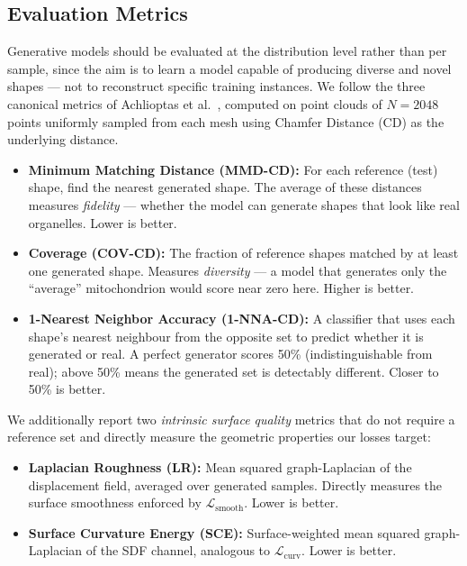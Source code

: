 \documentclass[10pt, a4paper, twocolumn]{article}
\begin{document}
\subsection{Evaluation Metrics}

Generative models should be evaluated at the distribution level rather than per sample, since the aim is to learn a model capable of producing diverse and novel shapes — not to reconstruct specific training instances. We follow the three canonical metrics of Achlioptas et al.~\cite{achlioptas2018learning}, computed on point clouds of $N=2048$ points uniformly sampled from each mesh using Chamfer Distance (CD) as the underlying distance.

\begin{itemize}
    \item \textbf{Minimum Matching Distance (MMD-CD):} For each reference (test) shape, find the nearest generated shape. The average of these distances measures \emph{fidelity} — whether the model can generate shapes that look like real organelles. Lower is better.

    \item \textbf{Coverage (COV-CD):} The fraction of reference shapes matched by at least one generated shape. Measures \emph{diversity} — a model that generates only the ``average'' mitochondrion would score near zero here. Higher is better.

    \item \textbf{1-Nearest Neighbor Accuracy (1-NNA-CD):} A classifier that uses each shape's nearest neighbour from the opposite set to predict whether it is generated or real. A perfect generator scores 50\% (indistinguishable from real); above 50\% means the generated set is detectably different. Closer to 50\% is better.
\end{itemize}

We additionally report two \emph{intrinsic surface quality} metrics that do not require a reference set and directly measure the geometric properties our losses target:

\begin{itemize}
    \item \textbf{Laplacian Roughness (LR):} Mean squared graph-Laplacian of the displacement field, averaged over generated samples. Directly measures the surface smoothness enforced by $\mathcal{L}_{\text{smooth}}$. Lower is better.
    \item \textbf{Surface Curvature Energy (SCE):} Surface-weighted mean squared graph-Laplacian of the SDF channel, analogous to $\mathcal{L}_{\text{curv}}$. Lower is better.
\end{itemize}
\end{document}
